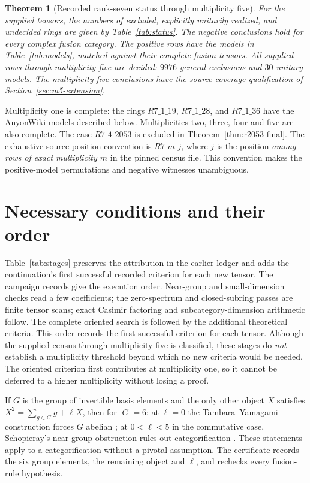 \documentclass[11pt]{article}
\newtheorem{theorem}{Theorem}
\begin{document}
\begin{theorem}[Recorded rank-seven status through multiplicity five]
\label{thm:status}
For the supplied tensors, the numbers of excluded, explicitly unitarily
realized, and undecided rings are given by Table~\ref{tab:status}.
The negative conclusions hold for \emph{every} complex fusion category.
The positive rows have the models in Table~\ref{tab:models}, matched
against their complete fusion tensors. All supplied rows through multiplicity
five are decided: $9976$ general exclusions and $30$ unitary models.
The multiplicity-five conclusions have the source
coverage qualification of Section~\ref{sec:m5-extension}.
\end{theorem}


Multiplicity one is complete: the rings $R7\_1\_19$,
$R7\_1\_28$, and $R7\_1\_36$ have the AnyonWiki models described below.
Multiplicities two, three, four and five are also complete. The
case $R7\_4\_2053$ is excluded in Theorem~\ref{thm:r2053-final}.
The exhaustive source-position convention is $R7\_m\_j$, where $j$
is the position \emph{among rows of exact multiplicity $m$} in the
pinned census file. This convention makes the positive-model
permutations and negative witnesses unambiguous.

\section{Necessary conditions and their order}
Table~\ref{tab:stages} preserves the attribution in the earlier ledger
and adds the continuation's first successful recorded criterion for
each new tensor. The campaign records give the execution order.
Near-group and small-dimension checks read a few coefficients; the
zero-spectrum and closed-subring passes are finite tensor scans;
exact Casimir factoring and subcategory-dimension arithmetic follow.
The complete oriented search is followed by the additional theoretical
criteria. This order records the first successful criterion for each
tensor. Although the supplied census through multiplicity five is classified,
these stages do \emph{not} establish a multiplicity threshold beyond
which no new criteria would be needed.
The oriented criterion first contributes at multiplicity one, so it
cannot be deferred to a higher multiplicity without losing a proof.

If $G$ is the group of invertible basis elements and the only other
object $X$ satisfies $X^2=\sum_{g\in G}g+\ell X$, then for $|G|=6$:
at $\ell=0$ the Tambara--Yamagami construction forces $G$ abelian
\cite{TY}; at $0<\ell<5$ in the commutative case,
Schopieray's near-group obstruction rules out categorification
\cite[Proposition~3.2]{Schopieray}. These statements apply to a
categorification without a pivotal assumption. The certificate records
the six group elements, the remaining object and $\ell$, and rechecks
every fusion-rule hypothesis.
\end{document}
